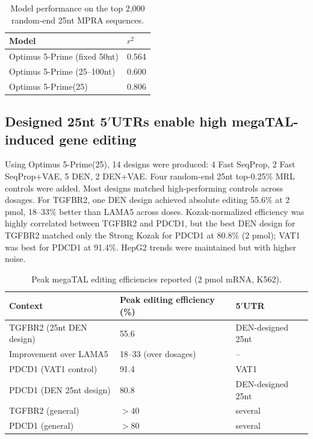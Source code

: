 \documentclass[11pt]{article}
\begin{document}
\begin{table}[h]
\centering
\caption{Model performance on the top 2{,}000 random-end 25nt MPRA sequences.}
\begin{tabular}{ll}
\toprule
Model & $r^2$ \\
\midrule
Optimus 5-Prime (fixed 50nt) & 0.564 \\
Optimus 5-Prime (25--100nt) & 0.600 \\
Optimus 5-Prime(25) & 0.806 \\
\bottomrule
\end{tabular}
\end{table}

\subsection{Designed 25nt 5$'$UTRs enable high megaTAL-induced gene editing}
Using Optimus 5-Prime(25), 14 designs were produced: 4 Fast SeqProp, 2 Fast SeqProp+VAE, 5 DEN, 2 DEN+VAE. Four random-end 25nt top-0.25\% MRL controls were added. Most designs matched high-performing controls across dosages. For TGFBR2, one DEN design achieved absolute editing 55.6\% at 2 pmol, 18--33\% better than LAMA5 across doses. Kozak-normalized efficiency was highly correlated between TGFBR2 and PDCD1, but the best DEN design for TGFBR2 matched only the Strong Kozak for PDCD1 at 80.8\% (2 pmol); VAT1 was best for PDCD1 at 91.4\%. HepG2 trends were maintained but with higher noise.

\begin{table}[h]
\centering
\caption{Peak megaTAL editing efficiencies reported (2 pmol mRNA, K562).}
\begin{tabular}{lll}
\toprule
Context & Peak editing efficiency (\%) & 5$'$UTR \\
\midrule
TGFBR2 (25nt DEN design) & 55.6 & DEN-designed 25nt \\
Improvement over LAMA5 & 18--33 (over dosages) & -- \\
PDCD1 (VAT1 control) & 91.4 & VAT1 \\
PDCD1 (DEN 25nt design) & 80.8 & DEN-designed 25nt \\
TGFBR2 (general) & $>$40 & several \\
PDCD1 (general) & $>$80 & several \\
\bottomrule
\end{tabular}
\end{table}
\end{document}
